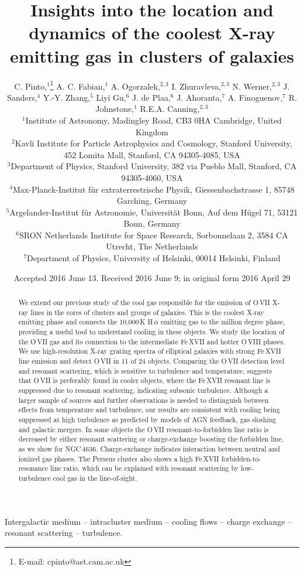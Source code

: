 \documentclass[useAMS,usenatbib]{mn2e}
\title[The coolest X-ray emitting gas in galaxy clusters]{Insights into the location and dynamics of the coolest X-ray emitting gas in clusters of galaxies}
\author[C. Pinto et al.]{C. Pinto,$^{1}$\thanks{E-mail:
cpinto@ast.cam.ac.uk} A. C. Fabian,$^{1}$ A. Ogorzalek,$^{2,3}$ I. Zhuravleva,$^{2,3}$ N. Werner,$^{2,3}$  \newauthor
J. Sanders,$^{4}$ Y.-Y. Zhang,$^{5}$ Liyi Gu,$^{6}$ J. de Plaa,$^{6}$ J. Ahoranta,$^{7}$ A. Finoguenov,$^{7}$ \newauthor 
R. Johnstone,$^{1}$ R.E.A. Canning,$^{2,3}$ \\
$^{1}$Institute of Astronomy, Madingley Road, CB3 0HA Cambridge, United Kingdom\\
$^{2}$Kavli Institute for Particle Astrophysics and Cosmology, Stanford University, 452 Lomita Mall, Stanford, CA 94305-4085, USA\\
$^{3}$Department of Physics, Stanford University, 382 via Pueblo Mall, Stanford, CA 94305-4060, USA\\
$^{4}$Max-Planck-Institut f\"ur extraterrestrische  Physik, Giessenbachstrasse 1, 85748 Garching, Germany\\
$^{5}$Argelander-Institut f\"ur Astronomie, Universit\"at Bonn, Auf dem H\"ugel 71, 53121 Bonn, Germany\\
$^{6}$SRON Netherlands Institute for Space Research, Sorbonnelaan 2, 3584 CA Utrecht, The Netherlands\\
$^{7}$Department of Physics, University of Helsinki, 00014 Helsinki, Finland
}
\begin{document}
\date{Accepted 2016 June 13. Received 2016 June 9; in original form 2016 April 29}

\pagerange{\pageref{firstpage}--\pageref{lastpage}} 

\maketitle

\label{firstpage}

\begin{abstract}
We extend our previous study of the cool gas responsible for the emission 
of O\,{\small VII} X-ray lines in the cores of clusters and groups of galaxies. 
This is the coolest X-ray emitting phase  
and connects the 10,000\,K H\,$\alpha$ emitting gas to 
the million degree phase, providing a useful tool to understand cooling in these objects.
We study the location of the O\,{\small VII} gas and 
its connection to the intermediate Fe\,{\small XVII} and hotter O\,{\small VIII} phases. 
We use high-resolution X-ray grating spectra of 
elliptical galaxies with strong Fe\,{\small XVII} line emission and 
detect O\,{\small VII} in 11 of 24 objects. 
Comparing the O\,{\small VII} detection level and resonant scattering,
which is sensitive to turbulence and {temperature}, 
suggests that O\,{\small VII} is preferably found 
in cooler objects, where the Fe\,{\small XVII} resonant 
line is suppressed due to resonant scattering, 
indicating {subsonic} turbulence.
{Although a larger sample of sources and further observations is needed to 
distinguish between effects from temperature and turbulence,} 
our results are consistent with cooling being suppressed at high turbulence 
as predicted by models of AGN feedback, gas sloshing and galactic mergers.
In some objects the O\,{\small VII} resonant-to-forbidden line ratio 
is decreased by either resonant scattering or
charge-exchange boosting the forbidden line, as we show for NGC\,4636.
Charge-exchange indicates interaction between neutral and ionized gas phases.
The Perseus cluster also shows a high Fe\,{\small XVII} 
forbidden-to-resonance line ratio, which can be explained with resonant scattering 
by low-turbulence cool gas in the line-of-sight.
\end{abstract}

\begin{keywords}
Intergalactic medium -- intracluster medium -- cooling flows -- charge exchange -- resonant scattering -- turbulence.
\end{keywords}
\end{document}
